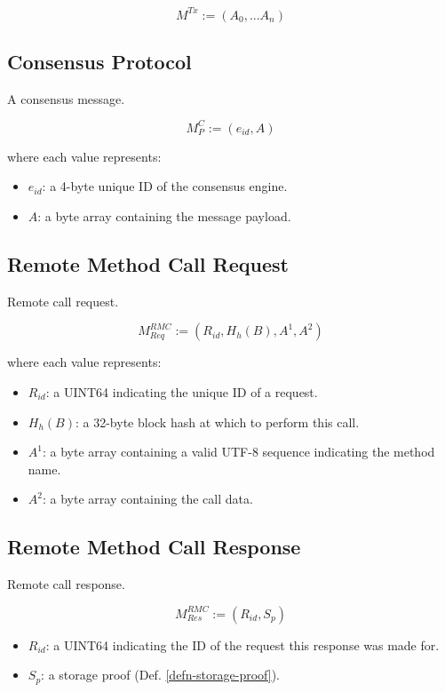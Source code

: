 \documentclass{book}
\begin{document}
\[
    M^{Tx} := (A_0, ... A_n)
\]

\subsection{Consensus Protocol}\label{sect-consensus-protocol}

A consensus message.

\[
    M^C_P := (e_{id}, A)
\]

where each value represents:

\begin{itemize}
    \item $e_{id}$: a 4-byte unique ID of the consensus engine.
    \item $A$: a byte array containing the message payload.
\end{itemize}

\subsection{Remote Method Call Request}

Remote call request.

\[
    M^{RMC}_{Req} := (R_{id}, H_h(B), A^1, A^2)
\]

where each value represents:

\begin{itemize}
    \item $R_{id}$: a UINT64 indicating the unique ID of a request.
    \item $H_h(B)$: a 32-byte block hash at which to perform this call.
    \item $A^1$: a byte array containing a valid UTF-8 sequence indicating the
    method name.
    \item $A^2$: a byte array containing the call data.
\end{itemize}

\subsection{Remote Method Call Response}

Remote call response.

\[
    M^{RMC}_{Res} := (R_{id}, S_p)
\]

\begin{itemize}
    \item $R_{id}$: a UINT64 indicating the ID of the request this response was
    made for.
    \item $S_p$: a storage proof (Def. \ref{defn-storage-proof}).
\end{itemize}
\end{document}
